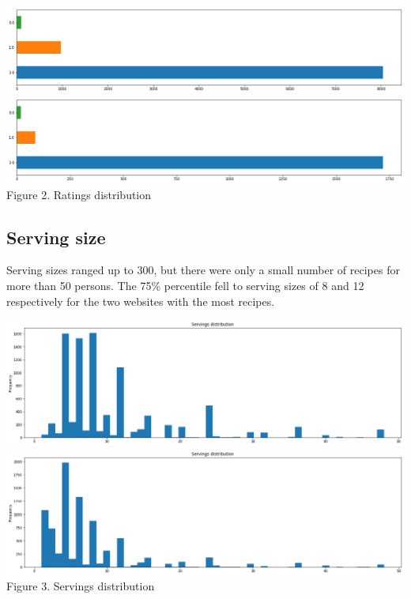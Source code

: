 \documentclass[11pt]{article}
\begin{document}
\vspace{5mm}
\begin{center}
\includegraphics[scale=0.085]{ratings-1}
\includegraphics[scale=0.085]{ratings-2}
\label{rating-dist} Figure 2. Ratings distribution
\end{center}
\vspace{5mm}

\subsection{Serving size}

Serving sizes ranged up to 300, but there were only a small number of recipes for more than 50 persons. The 75\% percentile fell to serving sizes of 8 and 12 respectively for the two websites with the most recipes. 

\vspace{5mm}
\begin{center}
\includegraphics[scale=0.085]{servings-1}
\includegraphics[scale=0.085]{servings-2}
\label{serving-dist} Figure 3. Servings distribution
\end{center}
\vspace{5mm}
\end{document}
